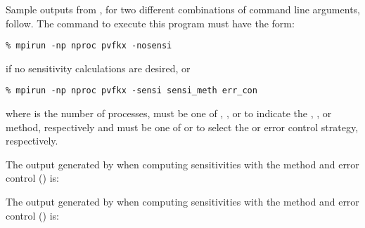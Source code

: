 Sample outputs from , for two different combinations of command line arguments, 
follow. The command to execute this program must have the form:
\begin{verbatim}
% mpirun -np nproc pvfkx -nosensi
\end{verbatim} 
if no sensitivity calculations are desired, or
\begin{verbatim}
% mpirun -np nproc pvfkx -sensi sensi_meth err_con
\end{verbatim}
where  is the number of processes,  must be one of , 
, or  to
indicate the , , or  method,
respectively and  must be one of  or  to
select the  or  error control strategy, respectively.

The output generated by  when computing sensitivities with the 
method and  error control () is:
{\small}

The output generated by  when computing sensitivities with the 
method and  error control () is:
{\small}
